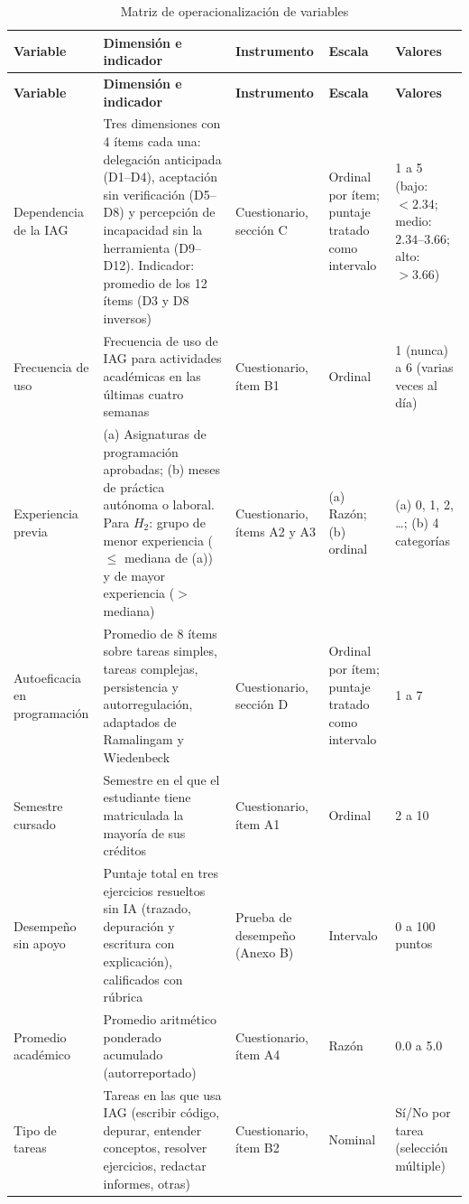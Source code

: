 \documentclass[12pt,letterpaper]{article}
\numberwithin{table}{section}
\numberwithin{figure}{section}
\begin{document}
\footnotesize
\begin{longtable}{@{}p{2.0cm}p{4.1cm}p{2.1cm}p{1.9cm}p{2.3cm}@{}}
\caption{Matriz de operacionalización de variables}
\label{tab:operacionalizacion} \\
\toprule
\textbf{Variable} & \textbf{Dimensión e indicador} & \textbf{Instrumento} & \textbf{Escala} & \textbf{Valores} \\
\midrule
\endfirsthead
\toprule
\textbf{Variable} & \textbf{Dimensión e indicador} & \textbf{Instrumento} & \textbf{Escala} & \textbf{Valores} \\
\midrule
\endhead
\bottomrule
\endfoot
Dependencia de la IAG & Tres dimensiones con 4 ítems cada una: delegación anticipada (D1--D4), aceptación sin verificación (D5--D8) y percepción de incapacidad sin la herramienta (D9--D12). Indicador: promedio de los 12 ítems (D3 y D8 inversos) & Cuestionario, sección C & Ordinal por ítem; puntaje tratado como intervalo & 1 a 5 (bajo: $<2.34$; medio: $2.34$--$3.66$; alto: $>3.66$) \\
\addlinespace
Frecuencia de uso & Frecuencia de uso de IAG para actividades académicas en las últimas cuatro semanas & Cuestionario, ítem B1 & Ordinal & 1 (nunca) a 6 (varias veces al día) \\
\addlinespace
Experiencia previa & (a) Asignaturas de programación aprobadas; (b) meses de práctica autónoma o laboral. Para $H_2$: grupo de menor experiencia ($\le$ mediana de (a)) y de mayor experiencia ($>$ mediana) & Cuestionario, ítems A2 y A3 & (a) Razón; (b) ordinal & (a) 0, 1, 2, \dots; (b) 4 categorías \\
\addlinespace
Autoeficacia en programación & Promedio de 8 ítems sobre tareas simples, tareas complejas, persistencia y autorregulación, adaptados de Ramalingam y Wiedenbeck~\cite{ramalingam1998development} & Cuestionario, sección D & Ordinal por ítem; puntaje tratado como intervalo & 1 a 7 \\
\addlinespace
Semestre cursado & Semestre en el que el estudiante tiene matriculada la mayoría de sus créditos & Cuestionario, ítem A1 & Ordinal & 2 a 10 \\
\addlinespace
Desempeño sin apoyo & Puntaje total en tres ejercicios resueltos sin IA (trazado, depuración y escritura con explicación), calificados con rúbrica & Prueba de desempeño (Anexo B) & Intervalo & 0 a 100 puntos \\
\addlinespace
Promedio académico & Promedio aritmético ponderado acumulado (autorreportado) & Cuestionario, ítem A4 & Razón & 0.0 a 5.0 \\
\addlinespace
Tipo de tareas & Tareas en las que usa IAG (escribir código, depurar, entender conceptos, resolver ejercicios, redactar informes, otras) & Cuestionario, ítem B2 & Nominal & Sí/No por tarea (selección múltiple) \\
\end{longtable}
\normalsize
\end{document}

